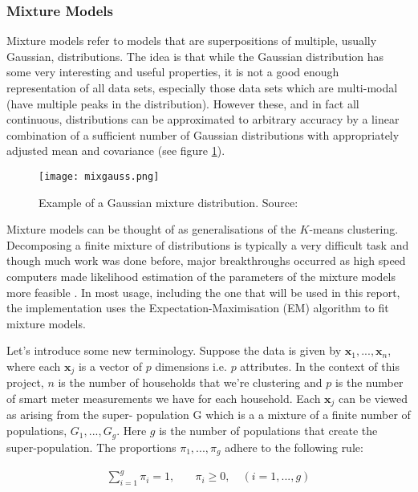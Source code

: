 \documentclass[a4paper]{article}
\begin{document}
\subsubsection{Mixture Models}
\label{subsubsec:mixmodels}
Mixture models refer to models that are superpositions of multiple, usually Gaussian, distributions. The idea is that while the Gaussian distribution has some very interesting and useful properties, it is not a good enough representation of all data sets, especially those data sets which are multi-modal (have multiple peaks in the distribution). However these, and in fact all continuous, distributions can be approximated to arbitrary accuracy by a linear combination of a sufficient number of Gaussian distributions with appropriately adjusted mean and covariance \citep{bk:mixmod} (see figure \ref{fig:mixgauss}).

\begin{figure}
\centering
\texttt{[image: mixgauss.png]}
\caption{Example of a Gaussian mixture distribution. Source: \cite{bishop}}
\label{fig:mixgauss} 
\end{figure}

Mixture models can be thought of as generalisations of the $K$-means clustering. Decomposing a finite mixture of distributions is typically a very difficult task and though much work was done before, major breakthroughs occurred as high speed computers made likelihood estimation of the parameters of the mixture models more feasible \cite{bk:mixmod}. In most usage, including the one that will be used in this report, the implementation uses the Expectation-Maximisation (EM) algorithm to fit mixture models.

Let's introduce some new terminology. Suppose the data is given by $\textbf{x}_1,...,\textbf{x}_n$, where each $\textbf{x}_j$ is a vector of $p$ dimensions i.e. $p$ attributes. In the context of this project, $n$ is the number of households that we're clustering and $p$ is the number of smart meter measurements we have for each household. Each $\textbf{x}_j$ can be viewed as arising from the super- population G which is a a mixture of a finite number of populations, $G_1, ... , G_g$. Here $g$ is the number of populations that create the super-population. The proportions $\pi_1, ... ,\pi_g$ adhere to the following rule:

\begin{align}\label{eq:pi}
\sum_{i=1}^g \pi_i = 1, \quad & \pi_i \ge 0,  \quad (i = 1, ... , g)
\end{align}
\end{document}
